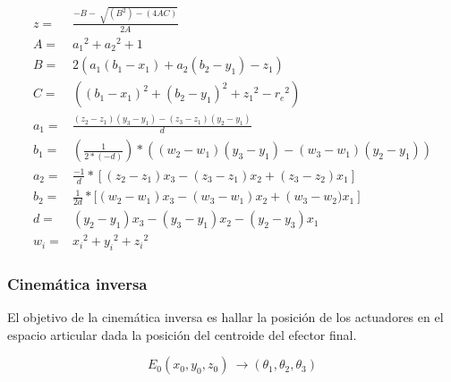    \begin{align}
        z={}& \frac{-B-\ \sqrt{\left(B^2\right)-\left(4AC\right)}}{2A}
        \label{eq:cap4_eq_4} \\
        A={}& {a_1}^2+{a_2}^2+1
        \label{eq:cap4_eq_5} \\
        B={}&  2\left(a_1(b_1-x_1)+a_2(b_2-y_1)-z_1\right)
        \label{eq:cap4_eq_6} \\
        C={}& ({(b_1-x_1)}^2+{(b_2-y_1)}^2+{z_1}^2- {r_e}^2) 
        \label{eq:cap4_eq_7} \\
        a_1={}& \frac{\left(z_2-z_1\right)\left(y_3-y_1\right)-\left(z_3-z_1\right)\left(y_2-y_1\right)}{d} 
        \label{eq:cap4_eq_8} \\
        b_1={}& \left(\frac{1}{2*(-d)}\right)*\left(\left(w_2 - w_1\right)\left(y_3-y_1\right)-\left(w_3 - w_1\right)\left(y_2-y_1\right)\right)
        \label{eq:cap4_eq_9} \\
        a_2={}& \frac{-1}{d}*\left[\left(z_2-z_1\right)x_3-(z_3-z_1)x_2+(z_3-z_2)x_1\right]
        \label{eq:cap4_eq_10} \\
        b_2={}& \frac{1}{2d}*[\left(w_2-w_1\right)x_3-\left(w_3-w_1\right)x_2+\left(w_3-w_2)x_1\right]
        \label{eq:cap4_eq_11} \\
        d={}& \left(y_2- y_1\right)x_3-\left(y_3-y_1\right)x_2- \left(y_2-y_3\right)x_1
        \label{eq:cap4_eq_12} \\
        w_i={}& {x_i}^2+{y_i}^2 +{z_i}^2
        \label{eq:cap4_eq_13} 
    \end{align}

         \newpage


        \subsubsection{Cinemática inversa} \label{ma_ci}
        El objetivo de la cinemática inversa es hallar la posición de los actuadores en el espacio articular dada la posición del centroide del efector final.
        
        \begin{equation}
            E_0(x_0,y_0,z_0)\ \to \left({\theta }_1,{\theta }_2,{\theta }_3\right)
        \end{equation}
        
